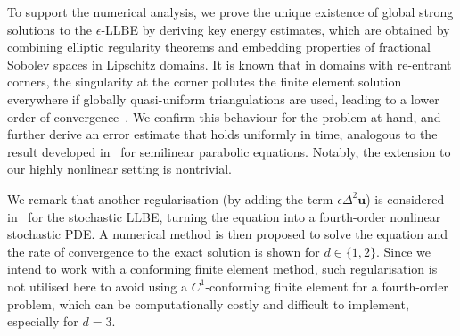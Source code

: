 \documentclass[11pt,reqno]{amsart}
\theoremstyle{definition}
\numberwithin{equation}{section}
\newcommand{\bff}{\boldsymbol}
\begin{document}
To support the numerical analysis, we prove the unique existence of global strong solutions to the $\epsilon$-LLBE by deriving key energy estimates, which are obtained by combining elliptic regularity theorems and embedding properties of fractional Sobolev spaces in Lipschitz domains. It is known that in domains with re-entrant corners, {the} singularity at the corner pollutes the finite element solution everywhere if globally quasi-uniform triangulations are used, leading to a lower order of convergence~\citep{ChaLazThoWah06, LiZha17}. We confirm this behaviour for the problem at hand, and further derive an error estimate that holds uniformly in time, analogous to the result developed in~\citep{Lar89} for semilinear parabolic equations. Notably, the extension to our highly nonlinear setting is nontrivial.


We remark that another regularisation (by adding the term $\epsilon
\Delta^2 \bff{u}$) is considered in~\citep{GolJiaLe22} for the stochastic LLBE, turning the equation into a
fourth-order nonlinear stochastic PDE. A numerical method is then proposed to
solve the equation and the rate of convergence to the exact solution is shown
for $d\in\{1,2\}$. Since we intend to work with a
conforming finite element method, such regularisation is not utilised here to avoid using a $C^1$-conforming finite element for a
fourth-order problem, which can be computationally costly and difficult to
implement, especially for $d=3$.
\end{document}
